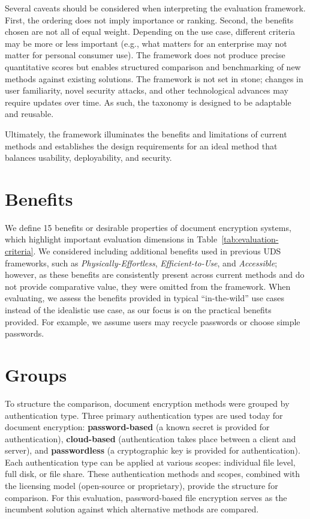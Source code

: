 Several caveats should be considered when interpreting the evaluation framework. First, the ordering does not imply importance or ranking. Second, the benefits chosen are not all of equal weight. Depending on the use case, different criteria may be more or less important (e.g., what matters for an enterprise may not matter for personal consumer use). The framework does not produce precise quantitative scores but enables structured comparison and benchmarking of new methods against existing solutions. The framework is not set in stone; changes in user familiarity, novel security attacks, and other technological advances may require updates over time. As such, the taxonomy is designed to be adaptable and reusable.

Ultimately, the framework illuminates the benefits and limitations of current methods and establishes the design requirements for an ideal method that balances usability, deployability, and security.

\section{Benefits}
\label{sec:uds-benefits}

We define 15 benefits or desirable properties of document encryption systems, which highlight important evaluation dimensions in Table~\ref{tab:evaluation-criteria}. We considered including additional benefits used in previous UDS frameworks, such as \emph{Physically-Effortless}, \emph{Efficient-to-Use}, and \emph{Accessible}; however, as these benefits are consistently present across current methods and do not provide comparative value, they were omitted from the framework. When evaluating, we assess the benefits provided in typical ``in-the-wild'' use cases instead of the idealistic use case, as our focus is on the practical benefits provided. For example, we assume users may recycle passwords or choose simple passwords.

\section{Groups}
\label{sec:uds-groups}

To structure the comparison, document encryption methods were grouped by authentication type. Three primary authentication types are used today for document encryption: \textbf{password-based} (a known secret is provided for authentication), \textbf{cloud-based} (authentication takes place between a client and server), and \textbf{passwordless} (a cryptographic key is provided for authentication). Each authentication type can be applied at various scopes: individual file level, full disk, or file share. These authentication methods and scopes, combined with the licensing model (open-source or proprietary), provide the structure for comparison. For this evaluation, password-based file encryption serves as the incumbent solution against which alternative methods are compared.

